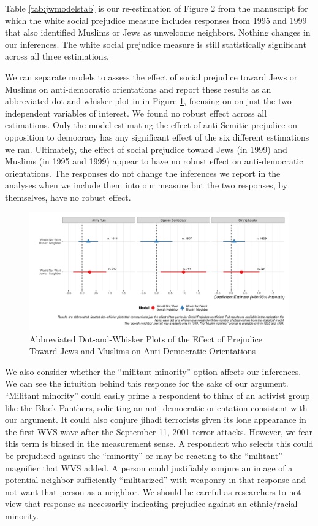 \documentclass[11pt,]{article}
\begin{document}
Table \ref{tab:jwmodelstab} is our re-estimation of Figure 2 from the
manuscript for which the white social prejudice measure includes
responses from 1995 and 1999 that also identified Muslims or Jews as
unwelcome neighbors. Nothing changes in our inferences. The white social
prejudice measure is still statistically significant across all three
estimations.

We ran separate models to assess the effect of social prejudice toward
Jews or Muslims on anti-democratic orientations and report these results
as an abbreviated dot-and-whisker plot in in Figure \ref{fig:jmseps},
focusing on on just the two independent variables of interest. We found
no robust effect across all estimations. Only the model estimating the
effect of anti-Semitic prejudice on opposition to democracy has any
significant effect of the six different estimations we ran. Ultimately,
the effect of social prejudice toward Jews (in 1999) and Muslims (in
1995 and 1999) appear to have no robust effect on anti-democratic
orientations. The responses do not change the inferences we report in
the analyses when we include them into our measure but the two
responses, by themselves, have no robust effect.

\begin{figure}
\centering
\includegraphics{figs/jmseps.pdf}
\caption{\label{fig:jmseps}Abbreviated Dot-and-Whisker Plots of the
Effect of Prejudice Toward Jews and Muslims on Anti-Democratic
Orientations}
\end{figure}

We also consider whether the ``militant minority'' option affects our
inferences. We can see the intuition behind this response for the sake
of our argument. ``Militant minority'' could easily prime a respondent
to think of an activist group like the Black Panthers, soliciting an
anti-democratic orientation consistent with our argument. It could also
conjure jihadi terrorists given its lone appearance in the first WVS
wave after the September 11, 2001 terror attacks. However, we fear this
term is biased in the measurement sense. A respondent who selects this
could be prejudiced against the ``minority'' or may be reacting to the
``militant'' magnifier that WVS added. A person could justifiably
conjure an image of a potential neighbor sufficiently ``militarized''
with weaponry in that response and not want that person as a neighbor.
We should be careful as researchers to not view that response as
necessarily indicating prejudice against an ethnic/racial minority.
\end{document}
